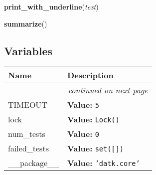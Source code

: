 \hspace{.8\funcindent}\begin{boxedminipage}{\funcwidth}

    \raggedright \textbf{print\_with\_underline}(\textit{text})

\setlength{\parskip}{2ex}
\setlength{\parskip}{1ex}
    \end{boxedminipage}

    \label{datk:core:tester:summarize}

    \vspace{0.5ex}

\hspace{.8\funcindent}\begin{boxedminipage}{\funcwidth}

    \raggedright \textbf{summarize}()

\setlength{\parskip}{2ex}
\setlength{\parskip}{1ex}
    \end{boxedminipage}



  \subsection{Variables}

    \vspace{-1cm}
\hspace{\varindent}\begin{longtable}{|p{\varnamewidth}|p{\vardescrwidth}|l}
\cline{1-2}
\cline{1-2} \centering \textbf{Name} & \centering \textbf{Description}& \\
\cline{1-2}
\endhead\cline{1-2}\multicolumn{3}{r}{\small\textit{continued on next page}}\\\endfoot\cline{1-2}
\endlastfoot\raggedright T\-I\-M\-E\-O\-U\-T\- & \raggedright \textbf{Value:} 
{\tt 5}&\\
\cline{1-2}
\raggedright l\-o\-c\-k\- & \raggedright \textbf{Value:} 
{\tt Lock()}&\\
\cline{1-2}
\raggedright n\-u\-m\-\_\-t\-e\-s\-t\-s\- & \raggedright \textbf{Value:} 
{\tt 0}&\\
\cline{1-2}
\raggedright f\-a\-i\-l\-e\-d\-\_\-t\-e\-s\-t\-s\- & \raggedright \textbf{Value:} 
{\tt \texttt{set([}\texttt{])}}&\\
\cline{1-2}
\raggedright \_\-\_\-p\-a\-c\-k\-a\-g\-e\-\_\-\_\- & \raggedright \textbf{Value:} 
{\tt \texttt{'}\texttt{datk.core}\texttt{'}}&\\
\cline{1-2}
\end{longtable}

